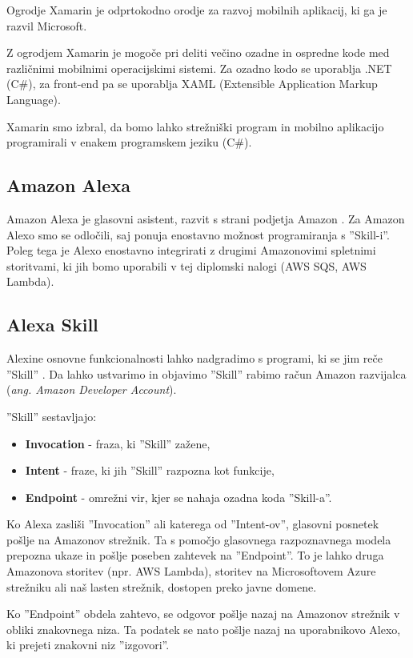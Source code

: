 \documentclass[a4paper, 12pt]{book}
\begin{document}
Ogrodje Xamarin \cite{xamarin} je odprtokodno orodje za razvoj mobilnih aplikacij, ki ga je razvil Microsoft. 

Z ogrodjem Xamarin je mogoče pri deliti večino ozadne in ospredne kode med različnimi mobilnimi operacijskimi sistemi. 
Za ozadno kodo se uporablja .NET (C\#), za front-end pa se uporablja XAML (Extensible Application Markup Language).

Xamarin smo izbral, da bomo lahko strežniški program in mobilno aplikacijo programirali v enakem programskem jeziku (C\#).

\subsection{Amazon Alexa}

Amazon Alexa je glasovni asistent, razvit s strani podjetja Amazon \cite{alexa}.
Za Amazon Alexo smo se odločili, saj ponuja enostavno možnost programiranja s ''Skill-i''.
Poleg tega je Alexo enostavno integrirati z drugimi Amazonovimi spletnimi storitvami, ki jih bomo uporabili v tej diplomski nalogi (AWS SQS, AWS Lambda).

\subsection{Alexa Skill}

Alexine osnovne funkcionalnosti lahko nadgradimo s programi, ki se jim reče ''Skill'' \cite{alexaskills}.
Da lahko ustvarimo in objavimo ''Skill'' rabimo račun Amazon razvijalca (\textit{ang. Amazon Developer Account}).


\noindent ''Skill'' sestavljajo:
\begin{itemize}
	\item \textbf{Invocation} - fraza, ki ''Skill'' zažene,
	\item \textbf{Intent} - fraze, ki jih ''Skill'' razpozna kot funkcije,
	\item \textbf{Endpoint} - omrežni vir, kjer se nahaja ozadna koda ''Skill-a''.
\end{itemize}

Ko Alexa zasliši ''Invocation'' ali katerega od ''Intent-ov'', glasovni posnetek pošlje na Amazonov strežnik.
Ta s pomočjo glasovnega razpoznavnega modela prepozna ukaze in pošlje poseben zahtevek na ''Endpoint''.
To je lahko druga Amazonova storitev (npr. AWS Lambda), storitev na Microsoftovem Azure strežniku ali naš lasten strežnik, dostopen preko javne domene.

Ko ''Endpoint'' obdela zahtevo, se odgovor pošlje nazaj na Amazonov strežnik v obliki znakovnega niza.
Ta podatek se nato pošlje nazaj na uporabnikovo Alexo, ki prejeti znakovni niz ''izgovori''.
\end{document}
